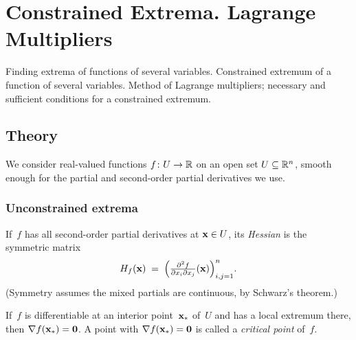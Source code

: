
\section{Constrained Extrema. Lagrange Multipliers}
\label{sec:1.1.11-conditional-extrema}

\begin{ticket}
Finding extrema of functions of several variables. Constrained extremum of a function of several variables. Method of Lagrange multipliers; necessary and sufficient conditions for a constrained extremum.
\end{ticket}

\subsection*{Theory}

We consider real-valued functions $f \colon U \to \mathbb{R}$ on an open set
$U \subseteq \mathbb{R}^n$, smooth enough for the partial and second-order
partial derivatives we use.

\subsubsection*{Unconstrained extrema}

\begin{definition}
\label{def:hessian}
If~$f$ has all second-order partial derivatives at $\mathbf{x} \in U$,
its \emph{Hessian} is the symmetric matrix
\[
  H_f(\mathbf{x}) \;=\; \Bigl(\tfrac{\partial^2 f}{\partial x_i \partial x_j}(\mathbf{x})\Bigr)_{i,j = 1}^{n}.
\]
(Symmetry assumes the mixed partials are continuous, by Schwarz's
theorem.)
\end{definition}

\begin{theorem}
\label{thm:necessary-uncon}
If~$f$ is differentiable at an interior point~$\mathbf{x}_*$ of~$U$ and
has a local extremum there, then $\nabla f(\mathbf{x}_*) = \mathbf{0}$.
A point with $\nabla f(\mathbf{x}_*) = \mathbf{0}$ is called a
\emph{critical point} of~$f$.
\end{theorem}

